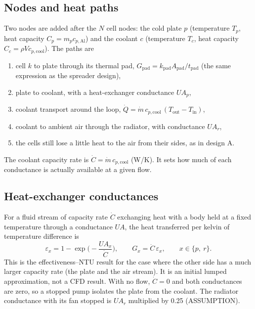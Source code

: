 \documentclass[11pt,a4paper]{article}
\begin{document}
\subsection{Nodes and heat paths}
Two nodes are added after the $N$ cell nodes: the cold plate $p$ (temperature $T_p$, heat capacity $C_p=m_pc_{p,\mathrm{Al}}$) and the coolant $c$ (temperature $T_c$, heat capacity $C_c=\rho V c_{p,\mathrm{cool}}$). The paths are
\begin{enumerate}
\item cell $k$ to plate through its thermal pad, $G_{\mathrm{pad}}=k_{\mathrm{pad}}A_{\mathrm{pad}}/t_{\mathrm{pad}}$ (the same expression as the spreader design),
\item plate to coolant, with a heat-exchanger conductance $UA_p$,
\item coolant transport around the loop, $\dot Q=\dot m\,c_{p,\mathrm{cool}}\,(T_{\mathrm{out}}-T_{\mathrm{in}})$,
\item coolant to ambient air through the radiator, with conductance $UA_r$,
\item the cells still lose a little heat to the air from their sides, as in design A.
\end{enumerate}
The coolant capacity rate is $\dot C=\dot m\,c_{p,\mathrm{cool}}$ (W/K). It sets how much of each conductance is actually available at a given flow.

\subsection{Heat-exchanger conductances}
For a fluid stream of capacity rate $\dot C$ exchanging heat with a body held at a fixed temperature through a conductance $UA$, the heat transferred per kelvin of temperature difference is
\begin{equation}
\varepsilon_x=1-\exp\!\Big(-\frac{UA_x}{\dot C}\Big),\qquad G_x=\dot C\,\varepsilon_x,\qquad x\in\{p,\ r\}.
\end{equation}
This is the effectiveness--NTU result for the case where the other side has a much larger capacity rate (the plate and the air stream). It is an initial lumped approximation, not a CFD result. With no flow, $\dot C=0$ and both conductances are zero, so a stopped pump isolates the plate from the coolant. The radiator conductance with its fan stopped is $UA_r$ multiplied by 0.25 (ASSUMPTION).
\end{document}
